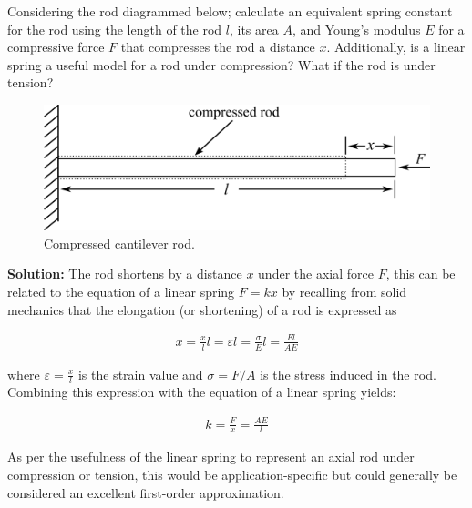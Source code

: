 \documentclass[12pt,letter]{article}
\begin{document}
			\begin{example}
    			
    			Considering the rod diagrammed below; calculate an equivalent spring constant for the rod using the length of the rod $l$, its area $A$, and Young's modulus $E$ for a compressive force $F$ that compresses the rod a distance $x$. Additionally, is a linear spring a useful model for a rod under compression? What if the rod is under tension?
        
		 		\begin{figure}[H]
		 			\centering
		 			\includegraphics[]{../figures/compressed_cantilever_rod.png}
		 			\caption{Compressed cantilever rod. }
		 		\end{figure}	   
       
			    \textbf{Solution:} The rod shortens by a distance $x$ under the axial force $F$, this can be related to the equation of a linear spring $F=kx$ by recalling from solid mechanics that the elongation (or shortening) of a rod is expressed as 
			
			    \begin{eqnarray}
			    x=\frac{x}{l}l=\varepsilon l = \frac{\sigma}{E}l = \frac{Fl}{AE}
			    \end{eqnarray}    
			    
			    where  $\varepsilon = \frac{x}{l}$ is the strain value and $\sigma = F/A$ is the stress induced in the rod. Combining this expression with the equation of a linear spring yields:
			    
			    \begin{eqnarray}
			    k = \frac{F}{x}= \frac{AE}{l}
			    \end{eqnarray}     
			   
			    As per the usefulness of the linear spring to represent an axial rod under compression or tension, this would be application-specific but could generally be considered an excellent first-order approximation.  
			
			\end{example}
\end{document}
